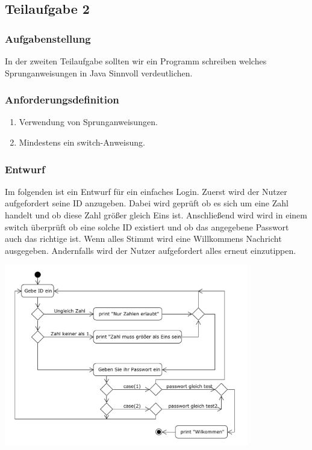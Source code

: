 \subsection{Teilaufgabe 2}
\subsubsection{Aufgabenstellung}
In der zweiten Teilaufgabe sollten wir ein Programm schreiben welches Sprunganweisungen in Java
 Sinnvoll verdeutlichen.

\subsubsection{Anforderungsdefinition}
\begin{enumerate}
	\item Verwendung von Sprunganweisungen.
	\item Mindestens ein switch-Anweisung.
\end{enumerate}

\subsubsection{Entwurf}
Im folgenden ist ein Entwurf für ein einfaches Login. Zuerst wird der Nutzer aufgefordert seine ID
anzugeben. Dabei wird geprüft ob es sich um eine Zahl handelt und ob diese Zahl grö\ss er gleich Eins ist.
Anschlie\ss end wird wird in einem switch überprüft ob eine solche ID existiert und ob das angegebene
Passwort auch das richtige ist. Wenn alles Stimmt wird eine Willkommens Nachricht  ausgegeben.
Andernfalls wird der Nutzer aufgefordert alles erneut einzutippen.
\begin{center}
	\includegraphics[width=0.8\textwidth]{uml/uml_c6_p2.pdf}
\end{center}


